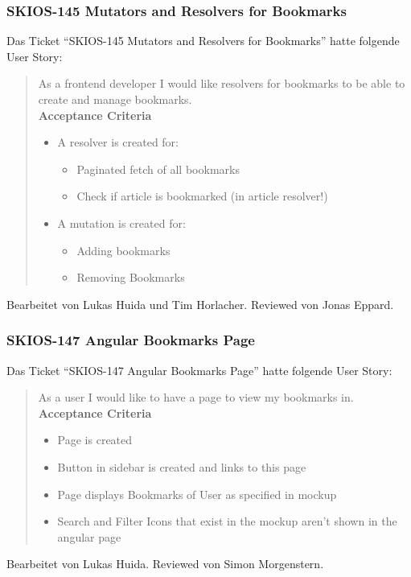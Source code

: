 \subsubsection{SKIOS-145 Mutators and Resolvers for Bookmarks}
Das Ticket \enquote{SKIOS-145 Mutators and Resolvers for Bookmarks} hatte folgende User Story:
\begin{quotation}
    As a frontend developer I would like resolvers for bookmarks to be able to create and manage bookmarks. \\
\textbf{Acceptance Criteria}
\begin{itemize}
    \item A resolver is created for:
    \begin{itemize}
        \item Paginated fetch of all bookmarks
        \item Check if article is bookmarked (in article resolver!)
    \end{itemize}
    \item A mutation is created for:
    \begin{itemize}
        \item Adding bookmarks
        \item Removing Bookmarks
    \end{itemize}
\end{itemize}
\end{quotation}
Bearbeitet von Lukas Huida und Tim Horlacher.
Reviewed von Jonas Eppard.

\subsubsection{SKIOS-147 Angular Bookmarks Page}
Das Ticket \enquote{SKIOS-147 Angular Bookmarks Page} hatte folgende User Story:
\begin{quotation}
    As a user I would like to have a page to view my bookmarks in. \\
\textbf{Acceptance Criteria}
\begin{itemize}
    \item Page is created
    \item Button in sidebar is created and links to this page
    \item Page displays Bookmarks of User as specified in mockup
    \item Search and Filter Icons that exist in the mockup aren't shown in the angular page
\end{itemize}
\end{quotation}
Bearbeitet von Lukas Huida.
Reviewed von Simon Morgenstern.

